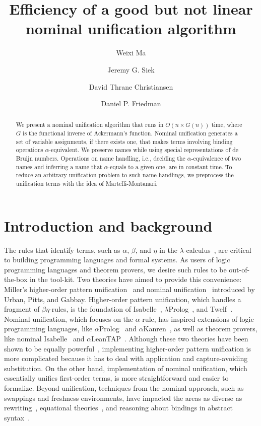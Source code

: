 \documentclass[a4paper,UKenglish]{lipics-v2016}
\title{Efficiency of a good but not linear nominal unification algorithm}
\author[1]{Weixi Ma}
\author[2]{Jeremy G. Siek}
\author[3]{David Thrane Christiansen}
\author[4]{Daniel P. Friedman}
\affil[1]{Indiana University,
  \texttt{mvc@iu.edu}}
\affil[2]{Indiana University,
  \texttt{jsiek@indiana.edu}}
\affil[3]{Galois, Inc.,
  \texttt{dtc@galois.com}}
\affil[4]{Indiana University,
  \texttt{dfried@indiana.edu}}
\begin{document}
\maketitle

\begin{abstract}
  We present a nominal unification algorithm
  that runs in $O(n \times G(n))$ time,
  where $G$ is the functional inverse of Ackermann's function.
  Nominal unification generates a set of variable assignments,
  if there exists one,
  that makes terms involving binding operations $\alpha$-equivalent.
  We preserve names while using special representations of de Bruijn numbers.
  Operations on name handling, i.e.,
  deciding the $\alpha$-equivalence of two names and
  inferring a name that $\alpha$-equals to a given one,
  are in constant time.
  To reduce an arbitrary unification problem to such name handlings,
  we preprocess the unification terms
  with the idea of Martelli-Montanari.
\end{abstract}

\section{Introduction and background}
The rules that identify terms, such as $\alpha$, $\beta$, and $\eta$
in the $\lambda$-calculus~\cite{church_calculi_1941},
are critical to building programming languages and formal systems.
As users of logic programming languages and theorem provers,
we desire such rules to be out-of-the-box in the tool-kit.
Two theories have aimed to provide this convenience:
Miller's higher-order pattern unification~\cite{miller_logic_1989} and
nominal unification~\cite{urban_nominal_2004} introduced by Urban, Pitts, and Gabbay.
Higher-order pattern unification, which handles a fragment of $\beta\eta$-rules,
is the foundation of Isabelle~\cite{paulson_natural_1986}, $\lambda$Prolog~\cite{nadathur_overview_1988}, and Twelf~\cite{pfenning_system_1999-1}.
Nominal unification, which focuses on the $\alpha$-rule,
has inspired extensions of logic programming languages, like $\alpha$Prolog~\cite{cheney_prolog:_2004} and $\alpha$Kanren~\cite{byrd_kanren:_2007},
as well as theorem provers, like nominal Isabelle~\cite{urban_nominal_2005} and $\alpha$LeanTAP~\cite{near_leantap:_2008}.
Although these two theories have been shown to be equally powerful~\cite{cheney_relating_2005, levy_nominal_2012},
implementing higher-order pattern unification is more complicated
because it has to deal with application and capture-avoiding substitution.
On the other hand, implementation of nominal unification,
which essentially unifies first-order terms,
is more straightforward and easier to formalize.
Beyond unification, techniques from the nominal approach,
such as swappings and freshness environments,
have impacted the areas as diverse as
rewriting~\cite{fernandez_nominal_2004, fernandez_nominal_2005, fernandez_nominal_2007, aoto_nominal_2016},
equational theories~\cite{ayala-rincon_nominal_2016},
and reasoning about bindings in abstract syntax~\cite{pitts_metalanguage_2000, gabbay_new_2002}.
\end{document}
